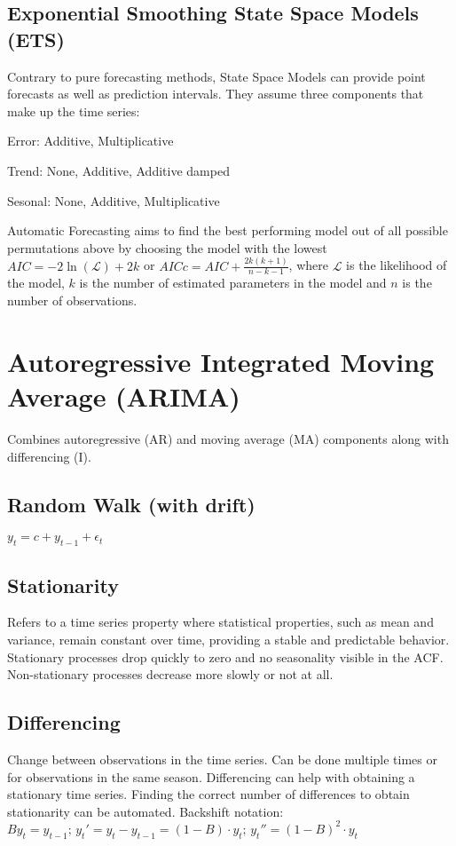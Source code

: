 \documentclass[10pt, a4paper]{article}
\begin{document}
\subsection{Exponential Smoothing State Space Models (ETS)}
Contrary to pure forecasting methods, State Space Models can provide point forecasts as well as prediction intervals.
They assume three components that make up the time series:

Error: {Additive, Multiplicative}

Trend: {None, Additive, Additive damped}

Sesonal: {None, Additive, Multiplicative}

\noindent
Automatic Forecasting aims to find the best performing model out of all possible permutations above by choosing
the model with the lowest $ AIC = -2 \ln(\mathcal{L}) + 2k $ or $ AICc = AIC + \frac{2k(k+1)}{n-k-1} $,
where $ \mathcal{L} $ is the likelihood of the model, $ k $ is the number of estimated parameters in the model and $ n $ is the number of observations.

\section{Autoregressive Integrated Moving Average (ARIMA)}
Combines autoregressive (AR) and moving average (MA) components along with differencing (I).

\subsection{Random Walk (with drift)}
$ y_t = c + y_{t-1} + \epsilon_t $

\subsection{Stationarity}
Refers to a time series property where statistical properties, such as mean and variance, remain constant over time,
providing a stable and predictable behavior. Stationary processes drop quickly to zero and no seasonality visible in the ACF.
Non-stationary processes decrease more slowly or not at all.

\subsection{Differencing}
Change between observations in the time series. Can be done multiple times or for observations in the same season.
Differencing can help with obtaining a stationary time series. Finding the correct number of differences to obtain stationarity can be automated.
Backshift notation: $ By_t = y_{t-1} \text{; } y_t' = y_t - y_{t-1} = (1 - B) \cdot y_t \text{; } y_t'' = (1 - B)^2 \cdot y_t$
\end{document}
